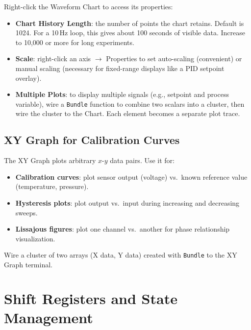 Right-click the Waveform Chart to access its properties:

\begin{itemize}[nosep,leftmargin=1.5em]
\item \textbf{Chart History Length}: the number of points the chart retains. Default is 1024. For a 10\,Hz loop, this gives about 100 seconds of visible data. Increase to 10{,}000 or more for long experiments.
\item \textbf{Scale}: right-click an axis $\to$ Properties to set auto-scaling (convenient) or manual scaling (necessary for fixed-range displays like a PID setpoint overlay).
\item \textbf{Multiple Plots}: to display multiple signals (e.g., setpoint and process variable), wire a \texttt{Bundle} function to combine two scalars into a cluster, then wire the cluster to the Chart. Each element becomes a separate plot trace.
\end{itemize}

\subsection{XY Graph for Calibration Curves}

The XY Graph plots arbitrary $x$-$y$ data pairs. Use it for:

\begin{itemize}[nosep,leftmargin=1.5em]
\item \textbf{Calibration curves}: plot sensor output (voltage) vs.\ known reference value (temperature, pressure).
\item \textbf{Hysteresis plots}: plot output vs.\ input during increasing and decreasing sweeps.
\item \textbf{Lissajous figures}: plot one channel vs.\ another for phase relationship visualization.
\end{itemize}

Wire a cluster of two arrays (X data, Y data) created with \texttt{Bundle} to the XY Graph terminal.

\section{Shift Registers and State Management}
\label{sec:lv_shift_reg}

